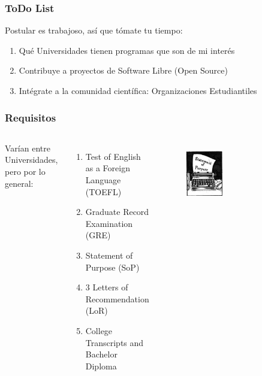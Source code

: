 \documentclass[10pt]{beamer}
\begin{document}
\begin{frame}
\frametitle{ToDo List}
Postular es {\color{magenta}trabajoso}, así que tómate tu tiempo:
\begin{enumerate}
\item{Qué Universidades tienen programas que son de mi interés}
\item{Contribuye a proyectos de Software Libre (Open Source)}
\item{Intégrate a la comunidad científica: Organizaciones Estudiantiles}
\end{enumerate}

\end{frame}

\begin{frame}
\frametitle{Requisitos}

\begin{columns}[t]

Varían entre Universidades, pero por lo general:

\begin{enumerate}
\item{Test of English as a Foreign Language (TOEFL)}
\item{Graduate Record Examination (GRE)}
\item{Statement of Purpose (SoP)}
\item{3 Letters of Recommendation (LoR)}
\item{College Transcripts and Bachelor Diploma}
\end{enumerate}

\begin{figure}
\includegraphics[scale=0.3]{figures/SoP_Logo.jpg} 	
	          \label{fig:SoPLogo}
	          \end{figure}
\begin{figure}[h]
			\centering


\end{figure}
\end{columns}
\end{frame}
\end{document}
